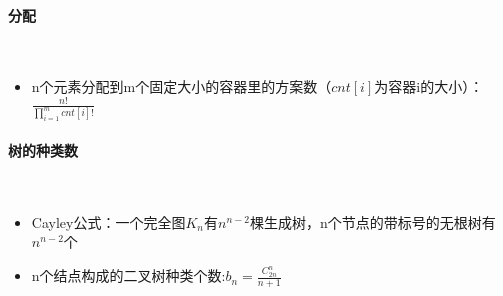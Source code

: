 \paragraph{分配}~{}
\par
\begin{itemize}
    \item n个元素分配到m个固定大小的容器里的方案数（$cnt[i]$为容器i的大小）：$\frac{n!}{\prod_{i=1}^{m}cnt[i]!}$
\end{itemize}
\paragraph{树的种类数}~{}
\par
\begin{itemize}
    \item Cayley公式：一个完全图$K_n$有$n^{n-2}$棵生成树，n个节点的带标号的无根树有$n^{n-2}$个
    \item n个结点构成的二叉树种类个数:$b_n=\frac{C^{n}_{2n}}{n+1}$
\end{itemize}